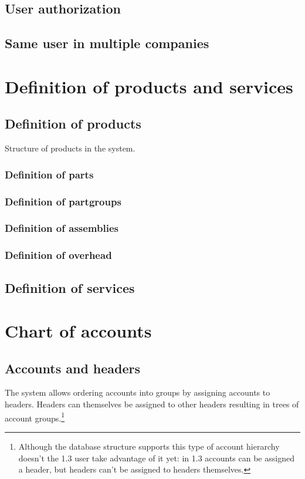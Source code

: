 \documentclass[10pt,A4]{book}
\begin{document}
\section{User authorization}

\section{Same user in multiple companies}

\chapter{Definition of products and services}

\section{Definition of products}
Structure of products in the system.

\subsection{Definition of parts}
\label{sec:DefinitionOfParts}

\subsection{Definition of partgroups}
\subsection{Definition of assemblies}
\subsection{Definition of overhead}

\section{Definition of services}

\chapter{Chart of accounts}

\section{Accounts and headers}

The system allows ordering accounts into groups by assigning accounts to headers. Headers
can themselves be assigned to other headers resulting in trees of account groups.\footnote{Although the database structure supports this type of account hierarchy
doesn't the 1.3 user take advantage of it yet: in 1.3 accounts can be assigned a header,
but headers can't be assigned to headers themselves.}
\end{document}
